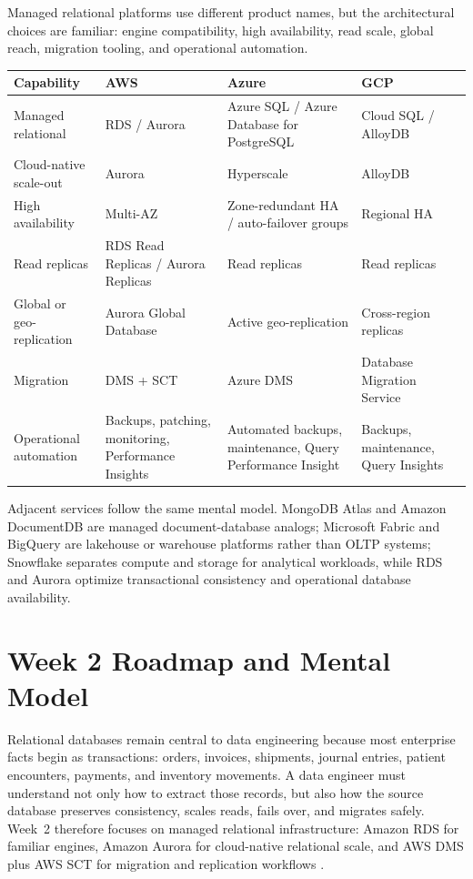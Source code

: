 \begin{crosscloud}
Managed relational platforms use different product names, but the architectural choices are familiar: engine compatibility, high availability, read scale, global reach, migration tooling, and operational automation.

\vspace{2mm}
{\footnotesize
\begin{tabular}{@{}p{2.9cm}p{3.0cm}p{3.1cm}p{3.1cm}@{}}
\toprule
\textbf{Capability} & \textbf{AWS} & \textbf{Azure} & \textbf{GCP} \\
\midrule
Managed relational & RDS / Aurora & Azure SQL / Azure Database for PostgreSQL & Cloud SQL / AlloyDB \\
Cloud-native scale-out & Aurora & Hyperscale & AlloyDB \\
High availability & Multi-AZ & Zone-redundant HA / auto-failover groups & Regional HA \\
Read replicas & RDS Read Replicas / Aurora Replicas & Read replicas & Read replicas \\
Global or geo-replication & Aurora Global Database & Active geo-replication & Cross-region replicas \\
Migration & DMS + SCT & Azure DMS & Database Migration Service \\
Operational automation & Backups, patching, monitoring, Performance Insights & Automated backups, maintenance, Query Performance Insight & Backups, maintenance, Query Insights \\
\bottomrule
\end{tabular}}

\vspace{1mm}
Adjacent services follow the same mental model. MongoDB Atlas and Amazon DocumentDB are managed document-database analogs; Microsoft Fabric and BigQuery are lakehouse or warehouse platforms rather than OLTP systems; Snowflake separates compute and storage for analytical workloads, while RDS and Aurora optimize transactional consistency and operational database availability.
\end{crosscloud}

\section{Week 2 Roadmap and Mental Model}
Relational databases remain central to data engineering because most enterprise facts begin as transactions: orders, invoices, shipments, journal entries, patient encounters, payments, and inventory movements. A data engineer must understand not only how to extract those records, but also how the source database preserves consistency, scales reads, fails over, and migrates safely. Week~2 therefore focuses on managed relational infrastructure: Amazon RDS for familiar engines, Amazon Aurora for cloud-native relational scale, and AWS DMS plus AWS SCT for migration and replication workflows \cite{awsRDSUserGuide,awsAuroraUserGuide,awsDMSUserGuide}.

